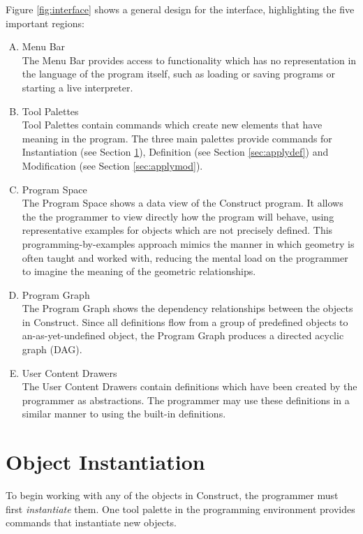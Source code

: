 \documentclass[twoside,openright,11pt]{report}
\begin{document}
Figure \ref{fig:interface} shows a general design for the interface, highlighting the five important regions:

\begin{enumerate}[(A)]
  \item Menu Bar \\
    The Menu Bar provides access to functionality which has no representation in the language of the program itself, such as loading or saving programs or starting a live interpreter.
  \item Tool Palettes \\
    Tool Palettes contain commands which create new elements that have meaning in the program. 
    The three main palettes provide commands for Instantiation (see Section \ref{sec:inst}), Definition (see Section \ref{sec:applydef}) and Modification (see Section \ref{sec:applymod}).
  \item Program Space \\
    The Program Space shows a data view of the Construct program. 
    It allows the the programmer to view directly how the program will behave, using representative examples for objects which are not precisely defined. 
    This programming-by-examples approach mimics the manner in which geometry is often taught and worked with, reducing the mental load on the programmer to imagine the meaning of the geometric relationships.
  \item Program Graph \\
    The Program Graph shows the dependency relationships between the objects in Construct. 
    Since all definitions flow from a group of predefined objects to an-as-yet-undefined object, the Program Graph produces a directed acyclic graph (DAG).
  \item User Content Drawers \\
    The User Content Drawers contain definitions which have been created by the programmer as abstractions.
    The programmer may use these definitions in a similar manner to using the built-in definitions.
\end{enumerate}

\section{Object Instantiation}
\label{sec:inst}

To begin working with any of the objects in Construct, the programmer must first {\it instantiate} them. 
One tool palette in the programming environment provides commands that instantiate new objects. 
\end{document}

